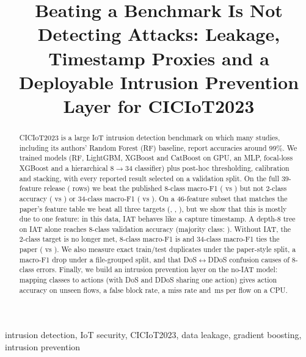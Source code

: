 \documentclass[conference]{IEEEtran}
\begin{document}
\title{Beating a Benchmark Is Not Detecting Attacks: Leakage, Timestamp Proxies and a Deployable
Intrusion Prevention Layer for CICIoT2023}

\author{
}

\maketitle

\begin{abstract}
CICIoT2023 is a large IoT intrusion detection benchmark on which many studies, including its authors' Random
Forest (RF) baseline, report accuracies around 99\%. We trained \nModels{} models (RF, LightGBM, XGBoost and CatBoost on
GPU, an MLP, focal-loss XGBoost and a hierarchical 8$\rightarrow$34 classifier) plus post-hoc thresholding,
calibration and stacking, with every reported result selected on a validation split. On the full 39-feature release
(\fullRows{} rows) we beat the published 8-class macro-F1 (\fullBestMfEight{} vs \paperMfEight{}) but not
2-class accuracy (\fullBestAccTwo{} vs \paperAccTwo{}) or 34-class macro-F1 (\fullBestMfThirtyFour{} vs
\paperMfThirtyFour{}). On a 46-feature subset that matches the paper's feature table we beat all three targets
(\vfBAccTwo{}, \vfBMfEight{}, \vfBMfThirtyFour{}), but we show that this is mostly due to one feature: in this
data, IAT behaves like a capture timestamp. A depth-8 tree on IAT alone reaches \iatAcc{} 8-class validation
accuracy (majority class: \iatMaj{}). Without IAT, the 2-class target is no longer met, 8-class macro-F1 is
\vfDMfEight{} and 34-class macro-F1 ties the paper (\vfDMfThirtyFour{} vs \paperMfThirtyFour{}). We also measure
\nOneTwin{} exact train/test duplicates under the paper-style split, a \nTwoDrop{} macro-F1 drop under a
file-grouped split, and that DoS$\leftrightarrow$DDoS confusion causes \nThreeShare{} of 8-class errors.
Finally, we build an intrusion prevention layer on the no-IAT model: mapping classes to actions (with DoS and
DDoS sharing one action) gives \idsActAcc{} action accuracy on \idsRows{} unseen flows, a \idsFalseBlock{} false
block rate, a \idsMiss{} miss rate and \idsLatSingle{}\,ms per flow on a CPU.
\end{abstract}

\begin{IEEEkeywords}
intrusion detection, IoT security, CICIoT2023, data leakage, gradient boosting, intrusion prevention
\end{IEEEkeywords}
\end{document}
